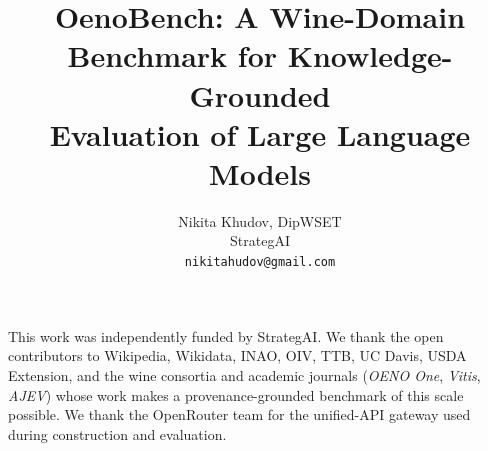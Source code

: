 \documentclass{article}
\title{OenoBench: A Wine-Domain Benchmark for Knowledge-Grounded \\
  Evaluation of Large Language Models}
\author{%
  Nikita Khudov, DipWSET \\
  StrategAI \\
  \texttt{nikitahudov@gmail.com}
}
\begin{document}
\makeatletter
\renewcommand{\@notice}{%
  \thispagestyle{firstpagefooter}%
}
\makeatother
{}
\maketitle










\begin{ack}
This work was independently funded by StrategAI. We thank the open
contributors to Wikipedia, Wikidata, INAO, OIV, TTB, UC Davis, USDA
Extension, and the wine consortia and academic journals
(\emph{OENO One}, \emph{Vitis}, \emph{AJEV}) whose work makes a
provenance-grounded benchmark of this scale possible. We thank the
OpenRouter team for the unified-API gateway used during construction
and evaluation.
\end{ack}




\appendix







\newpage

\end{document}
